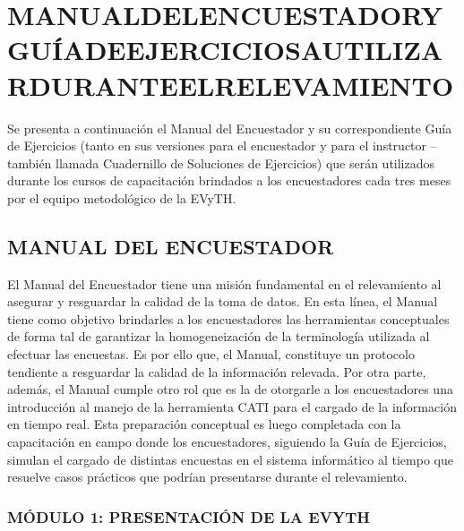 \documentclass[
  openany]{book}
\begin{document}
\hypertarget{manualdelencuestadoryguuxedadeejerciciosautilizarduranteelrelevamiento}{%
\section{\texorpdfstring{\textbf{MANUALDELENCUESTADORYGUÍADEEJERCICIOSAUTILIZARDURANTEELRELEVAMIENTO}}{MANUALDELENCUESTADORYGUÍADEEJERCICIOSAUTILIZARDURANTEELRELEVAMIENTO}}\label{manualdelencuestadoryguuxedadeejerciciosautilizarduranteelrelevamiento}}

Se presenta a continuación el Manual del Encuestador y su correspondiente Guía de Ejercicios (tanto en sus versiones para el encuestador y para el instructor --también llamada Cuadernillo de Soluciones de Ejercicios) que serán utilizados durante los cursos de capacitación brindados a los encuestadores cada tres meses por el equipo metodológico de la EVyTH.

\hypertarget{manual-del-encuestador}{%
\subsection{\texorpdfstring{\textbf{MANUAL DEL ENCUESTADOR}}{MANUAL DEL ENCUESTADOR}}\label{manual-del-encuestador}}

El Manual del Encuestador tiene una misión fundamental en el relevamiento al asegurar y resguardar la calidad de la toma de datos. En esta línea, el Manual tiene como objetivo brindarles a los encuestadores las herramientas conceptuales de forma tal de garantizar la homogeneización de la terminología utilizada al efectuar las encuestas. Es por ello que, el Manual, constituye un protocolo tendiente a resguardar la calidad de la información relevada. Por otra parte, además, el Manual cumple otro rol que es la de otorgarle a los encuestadores una introducción al manejo de la herramienta CATI para el cargado de la información en tiempo real. Esta preparación conceptual es luego completada con la capacitación en campo donde los encuestadores, siguiendo la Guía de Ejercicios, simulan el cargado de distintas encuestas en el sistema informático al tiempo que resuelve casos prácticos que podrían presentarse durante el relevamiento.

\hypertarget{muxf3dulo-1-presentaciuxf3n-de-la-evyth}{%
\subsubsection{\texorpdfstring{\textbf{MÓDULO 1: PRESENTACIÓN DE LA EVYTH}}{MÓDULO 1: PRESENTACIÓN DE LA EVYTH}}\label{muxf3dulo-1-presentaciuxf3n-de-la-evyth}}
\end{document}
